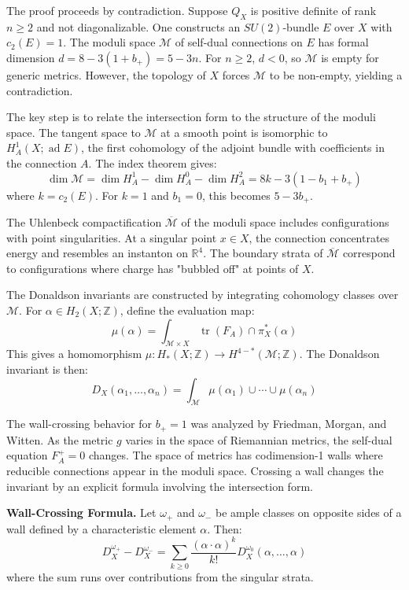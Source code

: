 The proof proceeds by contradiction. Suppose $Q_X$ is positive definite of rank $n \geq 2$ and not diagonalizable. One constructs an $SU(2)$-bundle $E$ over $X$ with $c_2(E) = 1$. The moduli space $\mathcal{M}$ of self-dual connections on $E$ has formal dimension $d = 8 - 3(1 + b_+) = 5 - 3n$. For $n \geq 2$, $d < 0$, so $\mathcal{M}$ is empty for generic metrics. However, the topology of $X$ forces $\mathcal{M}$ to be non-empty, yielding a contradiction.

The key step is to relate the intersection form to the structure of the moduli space. The tangent space to $\mathcal{M}$ at a smooth point is isomorphic to $H^1_A(X; \operatorname{ad} E)$, the first cohomology of the adjoint bundle with coefficients in the connection $A$. The index theorem gives:
\[
\dim \mathcal{M} = \dim H^1_A - \dim H^0_A - \dim H^2_A = 8k - 3(1 - b_1 + b_+)
\]
where $k = c_2(E)$. For $k = 1$ and $b_1 = 0$, this becomes $5 - 3b_+$.

The Uhlenbeck compactification $\overline{\mathcal{M}}$ of the moduli space includes configurations with point singularities. At a singular point $x \in X$, the connection concentrates energy and resembles an instanton on $\mathbb{R}^4$. The boundary strata of $\overline{\mathcal{M}}$ correspond to configurations where charge has "bubbled off" at points of $X$.

The Donaldson invariants are constructed by integrating cohomology classes over $\mathcal{M}$. For $\alpha \in H_2(X;\mathbb{Z})$, define the evaluation map:
\[
\mu(\alpha) = \int_{\mathcal{M} \times X} \operatorname{tr}(F_A) \cap \pi_X^*(\alpha)
\]
This gives a homomorphism $\mu: H_*(X;\mathbb{Z}) \to H^{4-*}(\mathcal{M};\mathbb{Z})$. The Donaldson invariant is then:
\[
D_X(\alpha_1, \ldots, \alpha_n) = \int_{\mathcal{M}} \mu(\alpha_1) \cup \cdots \cup \mu(\alpha_n)
\]

The wall-crossing behavior for $b_+ = 1$ was analyzed by Friedman, Morgan, and Witten. As the metric $g$ varies in the space of Riemannian metrics, the self-dual equation $F_A^+ = 0$ changes. The space of metrics has codimension-1 walls where reducible connections appear in the moduli space. Crossing a wall changes the invariant by an explicit formula involving the intersection form.

\textbf{Wall-Crossing Formula.} Let $\omega_+$ and $\omega_-$ be ample classes on opposite sides of a wall defined by a characteristic element $\alpha$. Then:
\[
D_X^{\omega_+} - D_X^{\omega_-} = \sum_{k \geq 0} \frac{(\alpha \cdot \alpha)^k}{k!} D_X^{\omega_0}(\alpha, \ldots, \alpha)
\]
where the sum runs over contributions from the singular strata.

